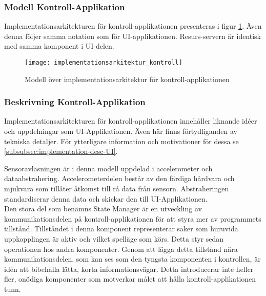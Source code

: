 \subsubsection{Modell Kontroll-Applikation}
Implementationsarkitekturen för kontroll-applikationen presenteras i figur \ref{fig:implementationsarkitektur-kontroll}. Även denna följer samma notation som för UI-applikationen. Resurs-servern är identisk med samma komponent i UI-delen.

\begin{figure}[h]
    \centering
    \texttt{[image: implementationsarkitektur\_kontroll]}
    \caption{Modell över implementationsarkitektur för kontroll-applikationen}
    \label{fig:implementationsarkitektur-kontroll}
\end{figure}

\subsubsection{Beskrivning Kontroll-Applikation}
Implementationsarkitekturen för kontroll-applikationen innehåller liknande idéer och uppdelningar som UI-Applikationen. Även här finns förtydliganden av tekniska detaljer. För ytterligare information och motivationer för dessa se \ref{subsubsec:implementation-desc-UI}.

Sensoravläsningen är i denna modell uppdelad i accelerometer och dataabstrahering. Accelerometerdelen består av den färdiga hårdvara och mjukvara som tillåter åtkomst till rå data från sensorn. Abstraheringen standardiserar denna data och skickar den till UI-Applikationen.\\

Den stora del som benämns State Manager är en utveckling av kommunikationsdelen på kontroll-applikationen för att styra mer av programmets tillstånd. Tillståndet i denna komponent representerar saker som huruvida uppkopplingen är aktiv och vilket spelläge som körs. Detta styr sedan operationen hos andra komponenter. Genom att lägga detta tillstånd nära kommunikationsdelen, som kan ses som den tyngsta komponenten i kontrollen, är idén att bibehålla lätta, korta informationsvägar. Detta introducerar inte heller fler, onödiga komponenter som motverkar målet att hålla kontroll-applikationen tunn.\\
